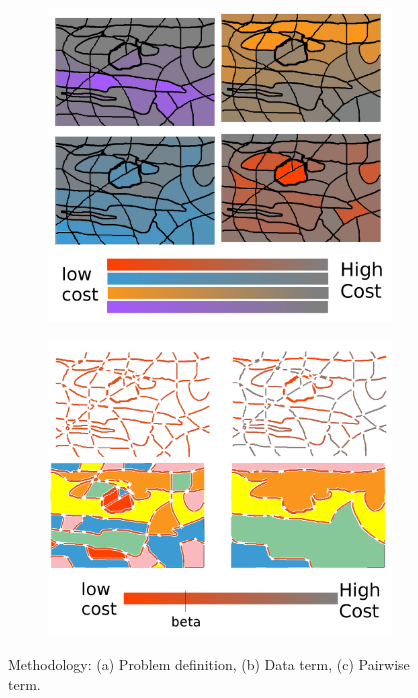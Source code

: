 \begin{figure}[t]
\begin{subfigure}[b]{0.39\textwidth}
        \includegraphics[width=\textwidth]{data}
        \label{fig:methodTerms:data}
    \end{subfigure}
    \hfill
    \begin{subfigure}[b]{0.39\textwidth}   
        \centering 
        \includegraphics[width=\textwidth]{smooth} 
        \label{fig:methodTerms:boundary}
    \end{subfigure}
    \caption {\small Methodology: (a) Problem definition, (b) Data term, (c) Pairwise term.} 
    \label{fig:methodTerms}
\end{figure}

